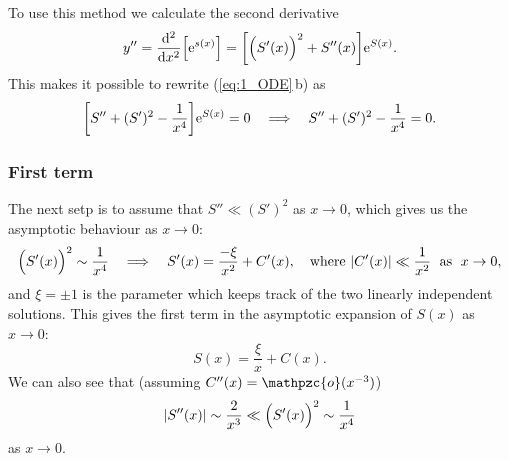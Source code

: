 \documentclass[11pt,letter, swedish, english
]{article}
\newcommand{\oh}{\ensuremath\mathpzc{o}}
\begin{document}
To use this method we calculate the second derivative
\begin{equation}
y''=\dv[2]{x}\qty[\mathrm{e}^{s(x)}]
=\qty[\Big(S'(x)\Big)^2 + S''(x)]\mathrm{e}^{S(x)}.
\end{equation}
This makes it possible to rewrite (\ref{eq:1_ODE}\,b) as
\begin{equation}\label{eq:1_DE_S}
\qty[S'' + (S')^2 -\frac{1}{x^4}]\mathrm{e}^{S(x)}=0
\quad\Longrightarrow\quad
S'' + (S')^2 -\frac{1}{x^4}=0. 
\end{equation}

\subsubsection{First term}
The next setp is to assume that $S''\ll(S')^2$ as $x\to0$, which gives
us the asymptotic behaviour as $x\to0$:
\begin{equation}\label{eq:1_S0'}
\Big(S'(x)\Big)^2\sim \frac{1}{x^4}
\quad\Longrightarrow\quad
S'(x)= \frac{-\xi}{x^2} + C'(x)\qcomma\text{where }
|C'(x)|\ll\frac{1}{x^2} \;\text{ as }\; x\to0,
\end{equation}
and $\xi=\pm1$\footnotemark{} is the parameter which keeps track of
the two linearly independent solutions. This gives the first term in
the asymptotic expansion of $S(x)$ as $x\to0$: 
\begin{equation}\label{eq:1_S0}
S(x)=\frac{\xi}{x} + C(x).
\end{equation}
We can also see that (assuming $C''(x)=\oh(x^{-3})$)
\begin{equation}
\abs{S''(x)}\sim\frac{2}{x^3}\ll\Big(S'(x)\Big)^2\sim\frac{1}{x^4}
\end{equation}
as $x\to0$.

\end{document}

